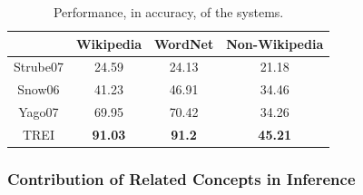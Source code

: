 
\begin{table}[!h]
  \small
  \begin{center}
    \begin{tabular}{|c||c|c|c|}
      &  Wikipedia  &  WordNet  &  Non-Wikipedia  \\
      \hline
      Strube07  &      24.59  &    24.13  &          21.18  \\
      Snow06    &      41.23  &    46.91  &          34.46  \\
      Yago07    &      69.95  &    70.42  &          34.26  \\
      TREI      &      {\bf 91.03}  &     {\bf 91.2}  &          {\bf 45.21}  \\
      \hline
    \end{tabular}
    \caption{Performance, in accuracy, of the systems.}
    \label{table:special-data}
  \end{center}
\end{table}


\subsubsection{Contribution of Related Concepts in Inference}
\label{sec:contr-relat-conc}

